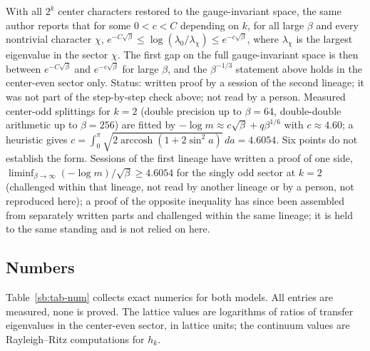 \begin{remark}\label{sb:rem-center}
With all $2^k$ center characters restored to the gauge-invariant space, the same author reports that for
some $0<c<C$ depending on $k$, for all large $\beta$ and every nontrivial character $\chi$,
$e^{-C\sqrt\beta}\le\log(\lambda_0/\lambda_\chi)\le e^{-c\sqrt\beta}$, where $\lambda_\chi$ is the largest
eigenvalue in the sector $\chi$. The first gap on the full gauge-invariant space is then between
$e^{-C\sqrt\beta}$ and $e^{-c\sqrt\beta}$ for large $\beta$, and the $\beta^{-1/3}$ statement above holds in
the center-even sector only. Status: written proof by a session of the second lineage; it was not part of
the step-by-step check above; not read by a person. Measured center-odd splittings for $k=2$ (double precision up to $\beta=64$, double-double arithmetic up to
$\beta=256$) are fitted by $-\log m\approx c\sqrt\beta+q\beta^{1/6}$ with $c\approx4.60$; a heuristic gives
$c=\int_0^\pi\sqrt{2\operatorname{arccosh}(1+2\sin^2a)}\,da=4.6054$. Six points do not establish the form. Sessions of the first lineage have written a proof
of one side, $\liminf_{\beta\to\infty}(-\log m)/\sqrt\beta\ge4.6054$ for the singly odd sector at $k=2$ (challenged
within that lineage, not read by another lineage or by a person, not reproduced here); a proof of the
opposite inequality has since been assembled from separately written parts and challenged within the same
lineage; it is held to the same standing and is not relied on here.
\end{remark}

\subsection{Numbers}
Table~\ref{sb:tab-num} collects exact numerics for both models. All entries are measured, none is proved.
The lattice values are logarithms of ratios of transfer eigenvalues in the center-even sector, in lattice
units; the continuum values are Rayleigh--Ritz computations for $h_k$.

